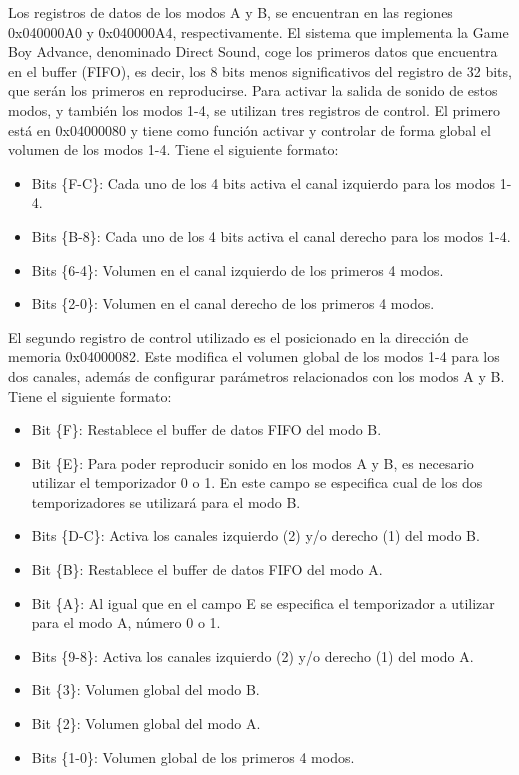 Los registros de datos de los modos A y B, se encuentran en las regiones 0x040000A0 y 0x040000A4, respectivamente. El sistema que implementa la Game Boy Advance, denominado Direct Sound, coge los primeros datos que encuentra en el buffer (FIFO), es decir, los 8 bits menos significativos del registro de 32 bits, que serán los primeros en reproducirse. Para activar la salida de sonido de estos modos, y también los modos 1-4, se utilizan tres registros de control. El primero está en 0x04000080 y tiene como función activar y controlar de forma global el volumen de los modos 1-4. Tiene el siguiente formato:

\begin{itemize}
	\item Bits \{F-C\}: Cada uno de los 4 bits activa el canal izquierdo para los modos 1-4.
	\item Bits \{B-8\}: Cada uno de los 4 bits activa el canal derecho para los modos 1-4.
	\item Bits \{6-4\}: Volumen en el canal izquierdo de los primeros 4 modos.
	\item Bits \{2-0\}: Volumen en el canal derecho de los primeros 4 modos.  
\end{itemize}

El segundo registro de control utilizado es el posicionado en la dirección de memoria 0x04000082. Este modifica el volumen global de los modos 1-4 para los dos canales, además de configurar parámetros relacionados con los modos A y B. Tiene el siguiente formato:

\begin{itemize}
	\item Bit \{F\}: Restablece el buffer de datos FIFO del modo B.
	\item Bit \{E\}: Para poder reproducir sonido en los modos A y B, es necesario utilizar el temporizador 0 o 1. En este campo se especifica cual de los dos temporizadores se utilizará para el modo B.
	\item Bits \{D-C\}: Activa los canales izquierdo (2) y/o derecho (1) del modo B.
	\item Bit \{B\}: Restablece el buffer de datos FIFO del modo A.
	\item Bit \{A\}: Al igual que en el campo {E} se especifica el temporizador a utilizar para el modo A, número 0 o 1.
	\item Bits \{9-8\}: Activa los canales izquierdo (2) y/o derecho (1) del modo A.  
	\item Bit \{3\}: Volumen global del modo B.  
	\item Bit \{2\}: Volumen global del modo A.  
	\item Bits \{1-0\}: Volumen global de los primeros 4 modos. 
\end{itemize}

